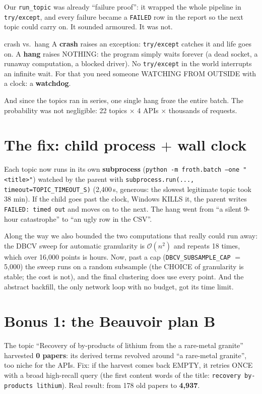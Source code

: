 \documentclass[11pt,a4paper]{article}
\begin{document}
Our \texttt{run\_topic} was already ``failure proof'': it wrapped the whole pipeline in
\texttt{try/except}, and every failure became a \texttt{FAILED} row in the report so the next
topic could carry on. It sounded armoured. It was not.

\begin{concepto}{crash vs.\ hang}
A \textbf{crash} raises an exception: \texttt{try/except} catches it and life goes on.
A \textbf{hang} raises NOTHING: the program simply waits forever (a dead socket, a runaway
computation, a blocked driver). No \texttt{try/except} in the world interrupts an infinite
wait. For that you need someone WATCHING FROM OUTSIDE with a clock: a \textbf{watchdog}.
\end{concepto}

And since the topics ran in series, one single hang froze the entire batch. The probability was
not negligible: 22 topics $\times$ 4 APIs $\times$ thousands of requests.

\section{The fix: child process $+$ wall clock}

Each topic now runs in its own \textbf{subprocess}
(\texttt{python -m froth.batch --one "<title>"}) watched by the parent with
\texttt{subprocess.run(..., timeout=TOPIC\_TIMEOUT\_S)} (2,400\,s, generous: the slowest
legitimate topic took 38 min). If the child goes past the clock, Windows KILLS it, the parent
writes \texttt{FAILED: timed out} and moves on to the next. The hang went from ``a silent
9-hour catastrophe'' to ``an ugly row in the CSV''.

Along the way we also bounded the two computations that really could run away: the DBCV sweep
for automatic granularity is $\mathcal{O}(n^2)$ and repeats 18 times, which over 16,000 points
is hours. Now, past a cap (\texttt{DBCV\_SUBSAMPLE\_CAP} $=$ 5,000) the sweep runs on a random
subsample (the CHOICE of granularity is stable; the cost is not), and the final clustering does
use every point. And the abstract backfill, the only network loop with no budget, got its time
limit.

\section{Bonus 1: the Beauvoir plan B}

The topic ``Recovery of by-products of lithium from the a rare-metal granite'' harvested \textbf{0
papers}: its derived terms revolved around ``a rare-metal granite'', too niche for the APIs. Fix: if
the harvest comes back EMPTY, it retries ONCE with a broad high-recall query (the first content
words of the title: \texttt{recovery by-products lithium}). Real result: from 178 old papers to
\textbf{4,937}.
\end{document}
